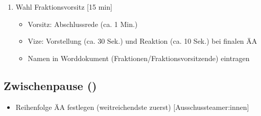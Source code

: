 \documentclass{article}
\begin{document}
\begin{enumerate}
\begin{enumerate}
\begin{itemize}
            		\begin{itemize}
					\item Unter \textbf{Name} die \textit{Fraktion} eintragen
            			\item Unter \textbf{Gremium,LAG...} den betreffenden \textit{Ausschuss} eintragen
            			\item Unter \textbf{E-Mail} \textit{simep@jef-bayern.de} eintragen
            		\end{itemize}
            		\item Bei ÄA bestätigen auf \textit{Veröffentlichen} klicken
            \end{itemize}
=======
>>>>>>> a7b0bb142dce7a83abb091924986f0d7a17e3b8b
		\end{enumerate} 
		\item Wahl Fraktionsvorsitz [15 min]
		\begin{itemize}
			\item Vorsitz: Abschlussrede (ca. 1 Min.)
			\item Vize: Vorstellung (ca. 30 Sek.) und Reaktion (ca. 10 Sek.) \newline bei finalen ÄA 
			\item Namen in Worddokument (Fraktionen/Fraktionsvorsitzende) \newline eintragen
		\end{itemize}
	\end{enumerate}
	
	\subsection{Zwischenpause (\timePauseOne)}
	\begin{itemize}
		\item Reihenfolge ÄA festlegen (weitreichendste zuerst) [Ausschussteamer:innen]
	\end{itemize}
	
\end{document}
